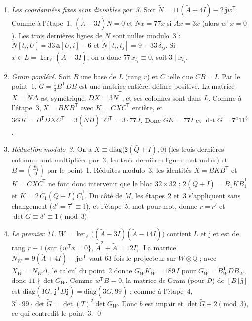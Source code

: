\documentclass[11pt,a4paper]{article}
\theoremstyle{remark}
\newcommand{\Z}{\mathbb{Z}}
\newcommand{\Q}{\mathbb{Q}}
\newcommand{\one}{\mathbf{j}}
\begin{document}
\begin{enumerate}[leftmargin=*,nosep]
\item \emph{Les coordonnées fixes sont divisibles par~3.} Soit $\tilde N=11(\tilde A+4I)-2\,\one w^{\mathsf T}$. Comme à
l'étape~1, $(\tilde A-3I)\tilde N=0$ et $\tilde Nx=77x$ si $\tilde Ax=3x$ (alors $w^{\mathsf T}x=0$). Les trois dernières lignes
de $\tilde N$ sont nulles modulo~3 : $\tilde N[t_i,U]=33\,\mathbf a[U,i]-6$ et $\tilde N[t_i,t_j]=9+33\,\delta_{ij}$. Si
$x\in L=\ker_\Z(\tilde A-3I)$, on a donc $77\,x_{t_i}\equiv0$, soit $3\mid x_{t_i}$.
\item \emph{Gram pondéré.} Soit $B$ une base de $L$ (rang $r$) et $C$ telle que $CB=I$. Par le point~1, $\tilde G=\tfrac13
B^{\mathsf T}DB$ est une matrice entière, définie positive. La matrice $X=\tilde N\Delta$ est symétrique, $DX=3\tilde N^{\mathsf T}$,
et ses colonnes sont dans $L$. Comme à l'étape~3, $X=BKB^{\mathsf T}$ avec $K=CXC^{\mathsf T}$ entière, et
$3\tilde GK=B^{\mathsf T}DXC^{\mathsf T}=3(\tilde NB)^{\mathsf T}C^{\mathsf T}=3\cdot77\,I$. Donc $\tilde GK=77I$ et
$\det\tilde G=7^a11^b$.
\item \emph{Réduction modulo~3.} On a $X\equiv\mathrm{diag}\bigl(2(\bar Q+I),0\bigr)$ (les trois dernières colonnes sont
multipliées par~3, les trois dernières lignes sont nulles) et $\bar B=\binom{\bar B_1}{0}$ par le point~1. Réduites modulo~3, les
identités $X=BKB^{\mathsf T}$ et $K=CXC^{\mathsf T}$ ne font donc intervenir que le bloc $32\times32$ :
$2(\bar Q+I)=\bar B_1\bar K\bar B_1^{\mathsf T}$ et $\bar K=2\,\bar C_1(\bar Q+I)\bar C_1^{\mathsf T}$. Du côté de $M$, les
étapes~2 et~3 s'appliquent sans changement ($d'=7^c\equiv1$), et l'étape~5, mot pour mot, donne $r=r'$ et
$\det\tilde G\equiv d'\equiv1\pmod3$.
\item \emph{Le premier 11.} $W=\ker_\Z\bigl((\tilde A-3I)(\tilde A-14I)\bigr)$ contient $L$ et $\one$ et est de rang $r+1$ (sur
$\{w^{\mathsf T}x=0\}$, $\tilde A^2+\tilde A=12I$). La matrice $N_W=9(\tilde A+4I)-\one w^{\mathsf T}$ vaut $63$ fois le projecteur
sur $W\otimes\Q$ ; avec $X_W=N_W\Delta$, le calcul du point~2 donne $G_WK_W=189\,I$ pour ${G_W=B_W^{\mathsf T}DB_W}$, donc
$11\nmid\det G_W$. Comme $w^{\mathsf T}B=0$, la matrice de Gram (pour $D$) de $[B\,|\,\one]$ est
$\mathrm{diag}(3\tilde G,\,\one^{\mathsf T}D\one)=\mathrm{diag}(3\tilde G,99)$ ; comme à l'étape~4,
$3^r\cdot99\cdot\det\tilde G=\det(T)^2\det G_W$. Donc $b$ est impair et $\det\tilde G\equiv2\pmod3$, ce qui contredit le
point~3. \qed
\end{enumerate}
\end{document}
